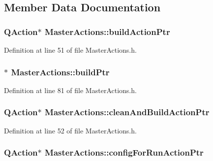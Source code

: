 \subsection{Member Data Documentation}
\hypertarget{class_master_actions_a627d91b89d122dd27addc931d1c91ca0}{
\subsubsection[{build\-Action\-Ptr}]{\setlength{\rightskip}{0pt plus 5cm}Q\-Action$\ast$ Master\-Actions\-::build\-Action\-Ptr\hspace{0.3cm}{\ttfamily [private]}}}\label{class_master_actions_a627d91b89d122dd27addc931d1c91ca0}


Definition at line 51 of file Master\-Actions.\-h.

\hypertarget{class_master_actions_a204854f9bf284e221292497cdb7182ab}{
\subsubsection[{build\-Ptr}]{$\ast$ Master\-Actions\-::build\-Ptr\hspace{0.3cm}{\ttfamily [private]}}}\label{class_master_actions_a204854f9bf284e221292497cdb7182ab}


Definition at line 81 of file Master\-Actions.\-h.

\hypertarget{class_master_actions_a2c0f332975bec2424d4af212ab566c5a}{
\subsubsection[{clean\-And\-Build\-Action\-Ptr}]{\setlength{\rightskip}{0pt plus 5cm}Q\-Action$\ast$ Master\-Actions\-::clean\-And\-Build\-Action\-Ptr\hspace{0.3cm}{\ttfamily [private]}}}\label{class_master_actions_a2c0f332975bec2424d4af212ab566c5a}


Definition at line 52 of file Master\-Actions.\-h.

\hypertarget{class_master_actions_acd6548d1110ae426f384bfeb6acc9c1f}{
\subsubsection[{config\-For\-Run\-Action\-Ptr}]{\setlength{\rightskip}{0pt plus 5cm}Q\-Action$\ast$ Master\-Actions\-::config\-For\-Run\-Action\-Ptr\hspace{0.3cm}{\ttfamily [private]}}}\label{class_master_actions_acd6548d1110ae426f384bfeb6acc9c1f}


